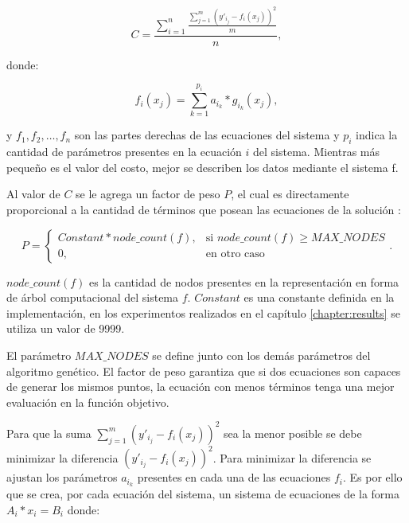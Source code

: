 $$C = \frac{\sum_{i=1}^n\frac{\sum_{j=1}^{m}(y'_{i_j} - f_i(x_j))^2}{m}}{n},$$

donde:

$$f_i(x_j) = \sum_{k=1}^{p_i} a_{i_k} * g_{i_k}(x_j),$$

y $f_1, f_2, \dots, f_n$ son las partes derechas de las ecuaciones del sistema y $p_i$ indica la cantidad de parámetros presentes en la ecuación $i$ del sistema. Mientras más pequeño es el valor del costo, mejor se describen los datos mediante el sistema f.

Al valor de $C$ se le agrega un factor de peso $P$, el cual es directamente proporcional a la cantidad de términos que posean las ecuaciones de la solución \cite{gplearnbloat}:

$$P = \begin{cases}
        Constant * node\_count(f), & \text{si } node\_count(f) \geq MAX\_NODES \\
        0,                         & \text{en otro caso}
    \end{cases}.$$

$node\_count(f)$ es la cantidad de nodos presentes en la representación en forma de árbol computacional del sistema $f$. $Constant$ es una constante definida en la implementación, en los experimentos realizados en el capítulo \ref{chapter:results} se utiliza un valor de 9999.

El parámetro $MAX\_NODES$ se define junto con los demás parámetros del algoritmo genético. El factor de peso garantiza que si dos ecuaciones son capaces de generar los mismos puntos, la ecuación con menos términos tenga una mejor evaluación en la función objetivo.

Para que la suma $\sum_{j=1}^{m}(y'_{i_j} - f_i(x_j)) ^ 2$ sea la menor posible se debe minimizar la diferencia $(y'_{i_j} - f_i(x_j))^2$. Para minimizar la diferencia se ajustan los parámetros $a_{i_k}$ presentes en cada una de las ecuaciones $f_i$. Es por ello que se crea, por cada ecuación del sistema, un sistema de ecuaciones de la forma $A_i * x_i = B_i$ donde:

